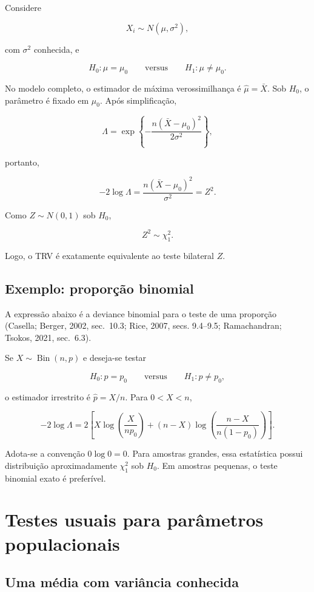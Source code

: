 \documentclass[
  letterpaper,
  DIV=11,
  numbers=noendperiod]{scrreprt}
\begin{document}
Considere

\[X_i\sim N(\mu,\sigma^2),\]

com \(\sigma^2\) conhecida, e

\[H_0:\mu=\mu_0
\qquad\text{versus}\qquad
H_1:\mu\neq\mu_0.\]

No modelo completo, o estimador de máxima verossimilhança é
\(\widehat\mu=\bar{X}\). Sob \(H_0\), o parâmetro é fixado em \(\mu_0\).
Após simplificação,

\[\Lambda
=
\exp\left\{-\frac{n(\bar{X}-\mu_0)^2}{2\sigma^2}\right\},\]

portanto,

\[-2\log\Lambda
=
\frac{n(\bar{X}-\mu_0)^2}{\sigma^2}
=Z^2.\]

Como \(Z\sim N(0,1)\) sob \(H_0\),

\[Z^2\sim\chi^2_1.\]

Logo, o TRV é exatamente equivalente ao teste bilateral \(Z\).

\subsection{Exemplo: proporção
binomial}\label{exemplo-proporuxe7uxe3o-binomial}

A expressão abaixo é a deviance binomial para o teste de uma proporção
(Casella; Berger, 2002, sec.~10.3; Rice, 2007, secs. 9.4--9.5;
Ramachandran; Tsokos, 2021, sec.~6.3).

Se \(X\sim\operatorname{Bin}(n,p)\) e deseja-se testar

\[H_0:p=p_0
\qquad\text{versus}\qquad
H_1:p\neq p_0,\]

o estimador irrestrito é \(\widehat p=X/n\). Para \(0<X<n\),

\[-2\log\Lambda
=
2\left[
X\log\left(\frac{X}{np_0}\right)
+(n-X)\log\left(\frac{n-X}{n(1-p_0)}\right)
\right].\]

Adota-se a convenção \(0\log 0=0\). Para amostras grandes, essa
estatística possui distribuição aproximadamente \(\chi^2_1\) sob
\(H_0\). Em amostras pequenas, o teste binomial exato é preferível.

\section{Testes usuais para parâmetros
populacionais}\label{testes-usuais-para-paruxe2metros-populacionais}

\subsection{Uma média com variância
conhecida}\label{uma-muxe9dia-com-variuxe2ncia-conhecida}
\end{document}
